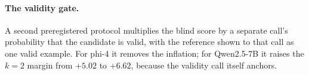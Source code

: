 \paragraph{The validity gate.}
A second preregistered protocol multiplies the blind score by a separate call's probability that the candidate is valid, with the reference shown to that call as one valid example. For phi-4 it removes the inflation; for Qwen2.5-7B it raises the $k{=}2$ margin from $+5.02$ to $+6.62$, because the validity call itself anchors.
